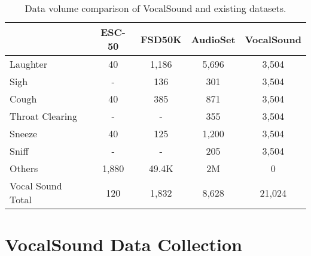\documentclass{article}
\newcommand{\squeezeup}{\vspace{-1.6mm}}
\begin{document}
\begin{table}[t]
\setlength\tabcolsep{2.5pt}
\small
\centering
\begin{tabular}{lcccc}
\hline
                              & ESC-50                       & FSD50K                      & AudioSet                  & VocalSound               \\ \hline
Laughter                      & 40                           & 1,186                        & 5,696                     & 3,504                    \\
Sigh                          & -                            & 136                            & 301                       & 3,504                    \\
Cough                         & 40                           & 385                          & 871                       & 3,504                    \\
Throat Clearing               & -                            & -                            & 355                       & 3,504                    \\
Sneeze                        & 40                           & 125                          & 1,200                     & 3,504                    \\
Sniff                         & -                            & -                          & 205                       & 3,504                    \\
{\color[HTML]{656565} Others} & {\color[HTML]{656565} 1,880} & {\color[HTML]{656565} 49.4K} & {\color[HTML]{656565} 2M} & {\color[HTML]{656565} 0} \\ \hline
Vocal Sound Total             & 120                          & 1,832                        & 8,628                     & 21,024                   \\ \hline
\end{tabular}
\caption{Data volume comparison of VocalSound and existing datasets.}
\label{tab:vssample}
\squeezeup
\end{table}



\squeezeup\squeezeup
\section{VocalSound Data Collection}
\squeezeup
\end{document}
